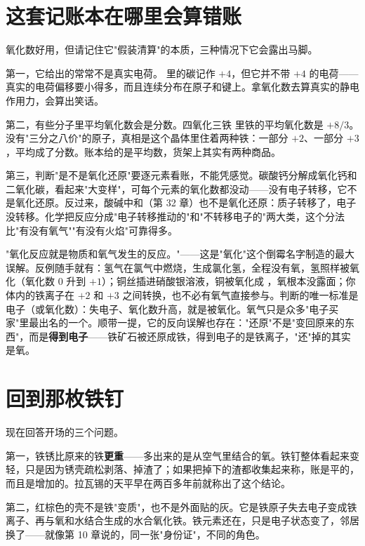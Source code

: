 \section{这套记账本在哪里会算错账}

氧化数好用，但请记住它"假装清算"的本质，三种情况下它会露出马脚。

第一，它给出的常常不是真实电荷。 里的碳记作 $+4$，但它并不带 $+4$ 的电荷——真实的电荷偏移要小得多，而且连续分布在原子和键上。拿氧化数去算真实的静电作用力，会算出笑话。

第二，有些分子里平均氧化数会是分数。四氧化三铁  里铁的平均氧化数是 $+8/3$。没有"三分之八价"的原子，真相是这个晶体里住着两种铁：一部分 $+2$、一部分 $+3$，平均成了分数。账本给的是平均数，货架上其实有两种商品。

第三，判断"是不是氧化还原"要逐元素看账，不能凭感觉。碳酸钙分解成氧化钙和二氧化碳，看起来"大变样"，可每个元素的氧化数都没动——没有电子转移，它不是氧化还原。反过来，酸碱中和（第 32 章）也不是氧化还原：质子转移了，电子没转移。化学把反应分成"电子转移推动的"和"不转移电子的"两大类，这个分法比"有没有氧气""有没有火焰"可靠得多。

\begin{wuqu}
"氧化反应就是物质和氧气发生的反应。"——这是"氧化"这个倒霉名字制造的最大误解。反例随手就有：氢气在氯气中燃烧，生成氯化氢，全程没有氧，氢照样被氧化（氧化数 0 升到 $+1$）；铜丝插进硝酸银溶液，铜被氧化成 ，氧根本没露面；你体内的铁离子在 $+2$ 和 $+3$ 之间转换，也不必有氧气直接参与。判断的唯一标准是电子（或氧化数）：失电子、氧化数升高，就是被氧化。氧气只是众多"电子买家"里最出名的一个。顺带一提，它的反向误解也存在："还原"不是"变回原来的东西"，而是\textbf{得到电子}——铁矿石被还原成铁，得到电子的是铁离子，"还"掉的其实是氧。
\end{wuqu}

\section{回到那枚铁钉}

现在回答开场的三个问题。

第一，铁锈比原来的铁\textbf{更重}——多出来的是从空气里结合的氧。铁钉整体看起来变轻，只是因为锈壳疏松剥落、掉渣了；如果把掉下的渣都收集起来称，账是平的，而且是增加的。拉瓦锡的天平早在两百多年前就称出了这个结论。

第二，红棕色的壳不是铁"变质"，也不是外面贴的灰。它是铁原子失去电子变成铁离子、再与氧和水结合生成的水合氧化铁。铁元素还在，只是电子状态变了，邻居换了——就像第 10 章说的，同一张"身份证"，不同的角色。


